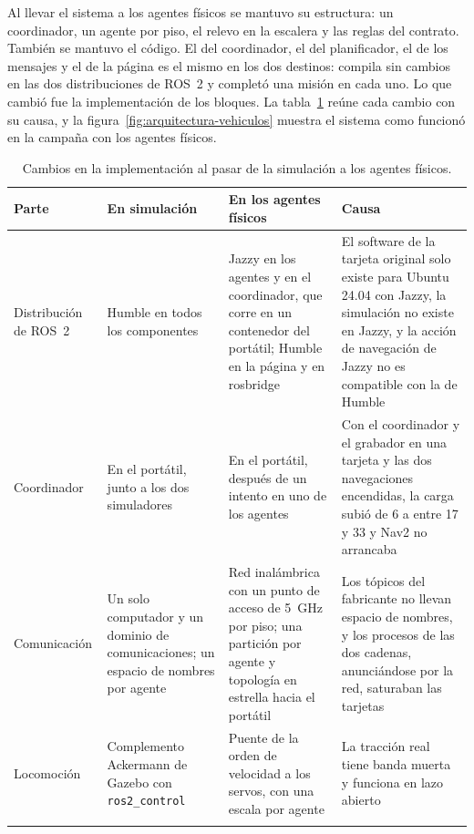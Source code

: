 Al llevar el sistema a los agentes físicos se mantuvo su estructura: un coordinador, un
agente por piso, el relevo en la escalera y las reglas del contrato. También se mantuvo el código. El del coordinador,
el del planificador, el de los mensajes y el de la página es el mismo en los dos
destinos: compila sin cambios en las dos distribuciones de ROS~2 y completó una
misión en cada uno. Lo que cambió fue la implementación de los bloques. La
tabla~\ref{tab:sim-vehiculos} reúne cada cambio con su causa, y la
figura~\ref{fig:arquitectura-vehiculos} muestra el sistema como funcionó en la campaña con los agentes físicos.

\begin{table}[htbp]
  \centering\footnotesize
  \caption{Cambios en la implementación al pasar de la simulación a los agentes físicos.}
  \label{tab:sim-vehiculos}
  \begin{tabular}{@{}p{}p{}p{}p{}@{}}
    \toprule
    \textbf{Parte} & \textbf{En simulación} & \textbf{En los agentes físicos} & \textbf{Causa} \\ \midrule
    Distribución de ROS~2 & Humble en todos los componentes & Jazzy en los agentes y en el coordinador, que corre en un contenedor del portátil; Humble en la página y en rosbridge & El software de la tarjeta original solo existe para Ubuntu 24.04 con Jazzy, la simulación no existe en Jazzy, y la acción de navegación de Jazzy no es compatible con la de Humble \\ \addlinespace
    Coordinador & En el portátil, junto a los dos simuladores & En el portátil, después de un intento en uno de los agentes & Con el coordinador y el grabador en una tarjeta y las dos navegaciones encendidas, la carga subió de 6 a entre 17 y 33 y Nav2 no arrancaba \\ \addlinespace
    Comunicación & Un solo computador y un dominio de comunicaciones; un espacio de nombres por agente & Red inalámbrica con un punto de acceso de 5~GHz por piso; una partición por agente y topología en estrella hacia el portátil & Los tópicos del fabricante no llevan espacio de nombres, y los procesos de las dos cadenas, anunciándose por la red, saturaban las tarjetas \\ \addlinespace
    Locomoción & Complemento Ackermann de Gazebo con \texttt{ros2\_control} & Puente de la orden de velocidad a los servos, con una escala por agente & La tracción real tiene banda muerta y funciona en lazo abierto \\ \addlinespace

\end{tabular}
\end{table}
